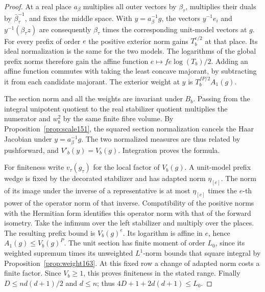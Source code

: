 \documentclass[a4paper,11pt]{article}
\theoremstyle{definition}
\theoremstyle{remark}
\numberwithin{equation}{section}
\begin{document}
\begin{proof}
At a real place \(a_\beta\) multiplies all outer vectors by
\(\beta_\tau\), multiplies their duals by
\(\bar\beta_\tau^{-1}\), and fixes the middle space. With
\(y=a_\beta^{-1}g\), the vectors \(y^{-1}e_i\) and
\(y^{-1}(\beta_\tau z)\) are consequently \(\beta_\tau\) times
the corresponding unit-model vectors at \(g\). For every prefix
of order \(e\) the positive exterior norm gains
\(T_b^{e/2}\) at that place. Its ideal normalization is the
same for the two models. The logarithms of the global prefix
norms therefore gain the affine function
\(e\mapsto fe\log(T_b)/2\). Adding an affine function commutes
with taking the least concave majorant, by subtracting it from
each candidate majorant. The exterior weight at \(y\) is
\(T_b^{fP/2}A_1(g)\).

The section norm and all the weights are invariant under \(B_b\).
Passing from the integral unipotent quotient to the real
stabilizer quotient multiplies the numerator and \(w_b^2\) by
the same finite fibre volume. By Proposition~\ref{prop:scale151},
the squared section normalization cancels the Haar Jacobian
under \(y=a_\beta^{-1}g\). The two normalized measures are
thus related by pushforward, and \(V'_b(y)=V_b(g)\).
Integration proves the formula.

For finiteness write \(v_\tau(g_\tau)\) for the local factor of
\(V_b(g)\). A unit-model prefix wedge is fixed by the
decorated stabilizer and has adapted norm \(\eta_{[e]}\).
The norm of its image under the inverse of a representative is
at most \(\eta_{[e]}\) times the \(e\)-th power of the operator
norm of that inverse. Compatibility of the positive norms
with the Hermitian form identifies this operator norm with
that of the forward isometry. Take the infimum over the left
stabilizer and multiply over the places. The resulting prefix
bound is \(V_b(g)^e\). Its logarithm is affine in \(e\), hence
\(A_1(g)\le V_b(g)^P\). The unit section has finite moment of
order \(L_0\), since its weighted supremum times its unweighted
\(L^1\)-norm bounds that square integral by
Proposition~\ref{prop:weight163}. At this fixed row a change of adapted norm costs a
finite factor. Since \(V_b\ge1\), this proves finiteness in
the stated range. Finally \(D\le nd(d+1)/2\) and \(d\le n\);
thus \(4D+1+2d(d+1)\le L_0\).
\end{proof}
\end{document}
